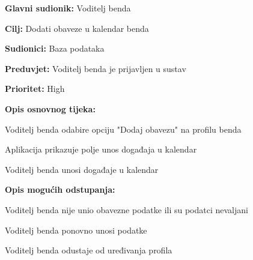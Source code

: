 \noindent {}
	\begin{packed_item}
		
		\item \textbf{Glavni sudionik: } Voditelj benda
		\item \textbf{Cilj:} Dodati obaveze u kalendar benda
		\item \textbf{Sudionici:} Baza podataka
		\item \textbf{Preduvjet:} Voditelj benda je prijavljen u sustav
		\item \textbf{Prioritet:} High
		\item \textbf{Opis osnovnog tijeka:} 
		
		\item[] \begin{packed_enum}
			
			\item Voditelj benda odabire opciju "Dodaj obavezu" na profilu benda
			\item Aplikacija prikazuje polje unos događaja u kalendar
			\item Voditelj benda unosi događaje u kalendar
		\end{packed_enum}
		
		\item  \textbf{Opis mogućih odstupanja:}
		\item[] \begin{packed_item}
			
			\item[3.a] Voditelj benda nije unio obavezne podatke ili su podatci nevaljani
			\item[] \begin{packed_enum}
				
				\item Voditelj benda ponovno unosi podatke
				\item Voditelj benda odustaje od uređivanja profila
				
			\end{packed_enum}	
		\end{packed_item}  
	\end{packed_item}
	
